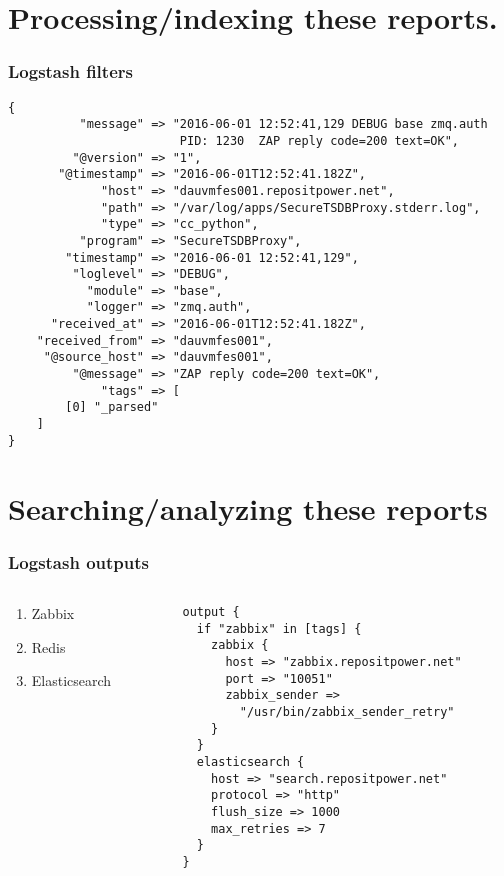\documentclass[13pt, ignorenonframetext]{beamer}
\begin{document}
\section{Processing/indexing these reports.}
\begin{frame}[fragile]
\frametitle{Logstash filters}
\begin{lstlisting}[basicstyle=\scriptsize]
{
          "message" => "2016-06-01 12:52:41,129 DEBUG base zmq.auth 
                        PID: 1230  ZAP reply code=200 text=OK",
         "@version" => "1",
       "@timestamp" => "2016-06-01T12:52:41.182Z",
             "host" => "dauvmfes001.repositpower.net",
             "path" => "/var/log/apps/SecureTSDBProxy.stderr.log",
             "type" => "cc_python", 
          "program" => "SecureTSDBProxy",
        "timestamp" => "2016-06-01 12:52:41,129",
         "loglevel" => "DEBUG",
           "module" => "base",
           "logger" => "zmq.auth",  
      "received_at" => "2016-06-01T12:52:41.182Z",
    "received_from" => "dauvmfes001",
     "@source_host" => "dauvmfes001",
         "@message" => "ZAP reply code=200 text=OK",
             "tags" => [
        [0] "_parsed"
    ]
}
\end{lstlisting}
\end{frame}

\section{Searching/analyzing these reports}
\begin{frame}[fragile]
\frametitle{Logstash outputs}
      \begin{columns}[c] %
     \begin{column}{3.0cm} %
\begin{enumerate}
\item Zabbix
\item Redis
\item Elasticsearch
\end{enumerate}
     \end{column}
     \begin{column}{6.0cm} %
\begin{lstlisting}[basicstyle=\scriptsize]
output {
  if "zabbix" in [tags] {
    zabbix {
      host => "zabbix.repositpower.net"
      port => "10051"
      zabbix_sender => 
        "/usr/bin/zabbix_sender_retry"
    }
  }
  elasticsearch {
    host => "search.repositpower.net"
    protocol => "http"
    flush_size => 1000
    max_retries => 7
  }
}
\end{lstlisting}
     \end{column}
     \end{columns}
\end{frame}
\end{document}
